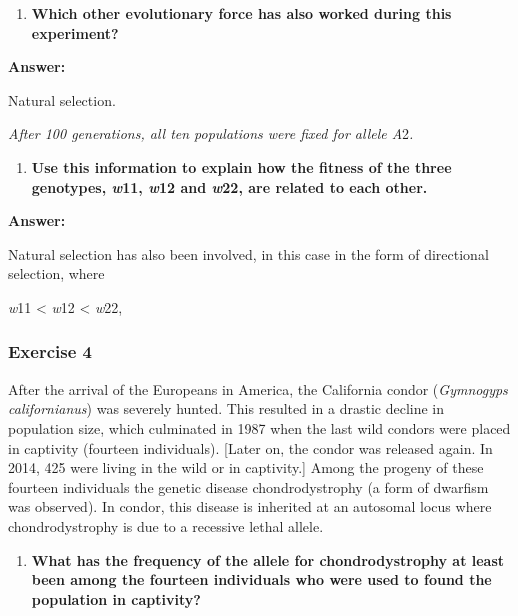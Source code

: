 \documentclass[]{article}
\providecommand{\tightlist}{%
  \setlength{\itemsep}{0pt}\setlength{\parskip}{0pt}}
\begin{document}
\begin{enumerate}
\def\labelenumi{\arabic{enumi})}
\setcounter{enumi}{1}
\tightlist
\item
  \textbf{Which other evolutionary force has also worked during this
  experiment? }
\end{enumerate}

\textbf{Answer:}

Natural selection.

\emph{After 100 generations, all ten populations were fixed for allele
A}2\emph{.}

\begin{enumerate}
\def\labelenumi{\arabic{enumi})}
\setcounter{enumi}{2}
\tightlist
\item
  \textbf{Use this information to explain how the fitness of the three
  genotypes, \emph{w}11, \emph{w}12 and \emph{w}22, are related to each
  other.}
\end{enumerate}

\textbf{Answer:}

Natural selection has also been involved, in this case in the form of
directional selection, where

\emph{w}11 \textless{} \emph{w}12 \textless{} \emph{w}22,

\hypertarget{exercise-4}{%
\subsubsection{Exercise 4}\label{exercise-4}}

After the arrival of the Europeans in America, the California condor
(\emph{Gymnogyps californianus}) was severely hunted. This resulted in a
drastic decline in population size, which culminated in 1987 when the
last wild condors were placed in captivity (fourteen individuals).
{[}Later on, the condor was released again. In 2014, 425 were living in
the wild or in captivity.{]} Among the progeny of these fourteen
individuals the genetic disease chondrodystrophy (a form of dwarfism was
observed). In condor, this disease is inherited at an autosomal locus
where chondrodystrophy is due to a recessive lethal allele.

\begin{enumerate}
\def\labelenumi{\arabic{enumi})}
\tightlist
\item
  \textbf{What has the frequency of the allele for chondrodystrophy at
  least been among the fourteen individuals who were used to found the
  population in captivity?}
\end{enumerate}
\end{document}
